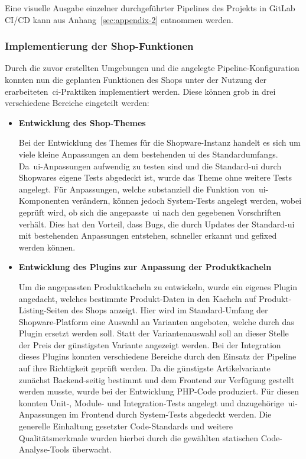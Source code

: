 Eine visuelle Ausgabe einzelner durchgeführter Pipelines des Projekts in GitLab CI/CD kann aus
Anhang\ \ref{sec:appendix-2} entnommen werden.

\subsubsection{Implementierung der Shop-Funktionen}

Durch die zuvor erstellten Umgebungen und die angelegte Pipeline-Konfiguration konnten nun die geplanten Funktionen des
Shops unter der Nutzung der erarbeiteten\ \acrshort{ci}-Praktiken implementiert werden.
Diese können grob in drei verschiedene Bereiche eingeteilt werden:

\begin{itemize}
    \item {
        \textbf{Entwicklung des Shop-Themes}\par
        Bei der Entwicklung des Themes für die Shopware-Instanz handelt es sich um viele kleine Anpassungen an dem
        bestehenden \acrfull{ui} des Standardumfangs.
        Da\ \acrshort{ui}-Anpassungen aufwendig zu testen sind und die Standard-\acrshort{ui} durch
        Shopwares eigene Tests abgedeckt ist, wurde das Theme ohne weitere Tests angelegt.
        Für Anpassungen, welche substanziell die Funktion von\ \acrshort{ui}-Komponenten verändern, können jedoch
        System-Tests angelegt werden, wobei geprüft wird, ob sich die angepasste\ \acrshort{ui} nach den gegebenen
        Vorschriften verhält.
        Dies hat den Vorteil, dass Bugs, die durch Updates der Standard-\acrshort{ui} mit bestehenden Anpassungen
        entstehen, schneller erkannt und gefixed werden können.
    }

    \clearpage

    \item {
        \textbf{Entwicklung des Plugins zur Anpassung der Produktkacheln}\par
        Um die angepassten Produktkacheln zu entwickeln, wurde ein eigenes Plugin angedacht, welches bestimmte
        Produkt-Daten in den Kacheln auf Produkt-Listing-Seiten des Shops anzeigt.
        Hier wird im Standard-Umfang der Shopware-Platform eine Auswahl an Varianten angeboten, welche durch das
        Plugin ersetzt werden soll.
        Statt der Variantenauswahl soll an dieser Stelle der Preis der günstigsten Variante angezeigt werden.
        Bei der Integration dieses Plugins konnten verschiedene Bereiche durch den Einsatz der Pipeline auf ihre
        Richtigkeit geprüft werden.
        Da die günstigste Artikelvariante zunächst Backend-seitig bestimmt und dem Frontend zur Verfügung
        gestellt werden musste, wurde bei der Entwicklung PHP-Code produziert.
        Für diesen konnten Unit-, Module- und Integration-Tests angelegt und dazugehörige\ \acrshort{ui}-Anpassungen
        im Frontend durch System-Tests abgedeckt werden.
        Die generelle Einhaltung gesetzter Code-Standards und weitere Qualitätsmerkmale wurden hierbei durch die
        gewählten statischen Code-Analyse-Tools überwacht.
    }


\end{itemize}
